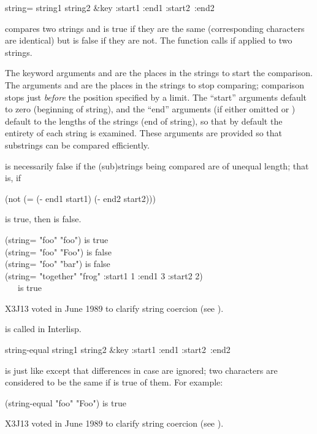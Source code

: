 \begin{defun}[Function]
string= string1 string2 &key :start1 :end1 :start2~:end2

 compares two strings and is true if
they are the same (corresponding characters are identical)
but is false if they are not.
The function  calls  if
applied to two strings.

The keyword arguments  and  are the places
in the strings to start the comparison.
The arguments  and  are the
places in the strings to stop comparing; comparison stops just
\emph{before} the position specified by a limit.
The ``start'' arguments default to zero (beginning of string),
and the ``end'' arguments (if either omitted or {\false})
default to the lengths of the strings (end of string),
so that by default the entirety of each string is examined.
These arguments are provided so that substrings can be compared
efficiently.

 is necessarily false if the (sub)strings
being compared are of unequal length; that is, if
\begin{lisp}
(not (= (- end1 start1) (- end2 start2)))
\end{lisp}
is true, then  is false.

\begin{lisp}
(string= "foo" "foo") \textrm{is true} \\
(string= "foo" "Foo") \textrm{is false} \\
(string= "foo" "bar") \textrm{is false} \\
(string= "together" "frog" :start1 1 :end1 3 :start2 2) \\
~~~\textrm{is true}
\end{lisp}

\begin{newer}
X3J13 voted in June 1989 
to clarify string coercion (see ).
\end{newer}

\beforenoterule
\begin{incompatibility}
 is called  in Interlisp.
\end{incompatibility}
\afternoterule
\end{defun}

\begin{defun}[Function]
string-equal string1 string2 &key :start1 :end1 :start2~:end2

 is just like  except that differences
in case are ignored; two characters are considered to be the same
if  is true of them.
For example:
\begin{lisp}
(string-equal "foo" "Foo") \textrm{is true}
\end{lisp}
\begin{newer}
X3J13 voted in June 1989 
to clarify string coercion (see ).
\end{newer}
\end{defun}

